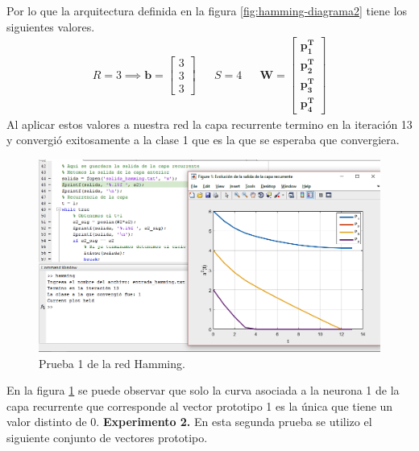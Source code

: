 \documentclass[12pt, titlepage]{article}
\begin{document}
    Por lo que la arquitectura definida en la figura \ref{fig:hamming-diagrama2} tiene los siguientes valores.
    \begin{align*}
    R = 3 \implies \boldsymbol{b} = \left[\begin{array}{c}3\\ 3\\ 3\end{array}\right] && S = 4 && \boldsymbol{W} = \left[\begin{array}{c}\boldsymbol{p^{T}_1}\\ \boldsymbol{p^{T}_2}\\ \boldsymbol{p^{T}_3} \\ \boldsymbol{p^{T}_4}\end{array}\right]
    \end{align*}
    Al aplicar estos valores a nuestra red la capa recurrente termino en la iteración 13 y convergió exitosamente a la clase 1 que es la que se esperaba que convergiera.
    \begin{figure}[H]
        \begin{center}
            \includegraphics[width=16cm]{img/hamming/hamming1.png}
            \caption{Prueba 1 de la red Hamming.}
            \label{fig:hamming1}
        \end{center}
    \end{figure}
    En la figura \ref{fig:hamming1} se puede observar que solo la curva asociada a la neurona 1 de la capa recurrente que corresponde al vector prototipo 1 es la única que tiene un valor distinto de 0.
    \newline
    \textbf{Experimento 2.}
    En esta segunda prueba se utilizo el siguiente conjunto de vectores prototipo.
\end{document}
